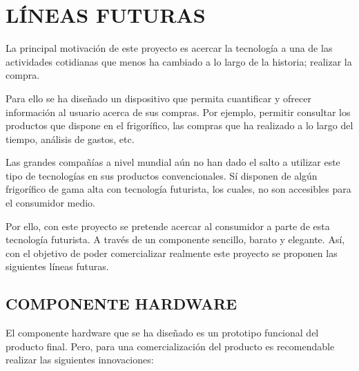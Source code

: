 \chapter{LÍNEAS FUTURAS}

La principal motivación de este proyecto es acercar la tecnología a una de las actividades cotidianas que menos ha cambiado a lo largo de la historia; realizar la compra.

Para ello se ha diseñado un dispositivo que permita cuantificar y ofrecer información al usuario acerca de sus compras. Por ejemplo, permitir consultar los productos que dispone en el frigorífico, las compras que ha realizado a lo largo del tiempo, análisis de gastos, etc.

Las grandes compañías a nivel mundial aún no han dado el salto a utilizar este tipo de tecnologías en sus productos convencionales. Sí disponen de algún frigorífico de gama alta con tecnología futurista, los cuales, no son accesibles para el consumidor medio.

Por ello, con este proyecto se pretende acercar al consumidor a parte de esta tecnología futurista. A través de un componente sencillo, barato y elegante. Así, con el objetivo de poder comercializar realmente este proyecto se proponen las siguientes líneas futuras.

\section{COMPONENTE HARDWARE}

El componente hardware que se ha diseñado es un prototipo funcional del producto final. Pero, para una comercialización del producto es recomendable realizar las siguientes innovaciones:

